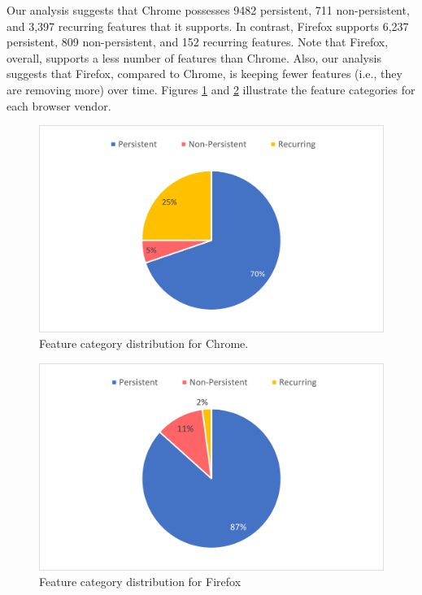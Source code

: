 Our analysis suggests that Chrome possesses 9482 persistent, 711
non-persistent, and 3,397 recurring features that it supports. In
contrast, Firefox supports 6,237 persistent, 809 non-persistent, and
152 recurring features. Note that Firefox, overall, supports a less
number of features than Chrome. Also, our analysis suggests that Firefox,
compared to Chrome, is keeping fewer features (i.e., they are removing
more) over time. Figures \ref{fig:chrome-categories} and
\ref{fig:firefox-categories} illustrate the feature categories for
each browser vendor.

\begin{figure}[ht]
    \centering
    \includegraphics[width=\columnwidth]{figures/chrome-feature-categories.png}
    \caption{Feature category distribution for Chrome.}
    \label{fig:chrome-categories}
\end{figure}

\begin{figure}[ht]
    \centering
    \includegraphics[width=\columnwidth]{figures/firefox-feature-categories.png}
    \caption{Feature category distribution for Firefox}
    \label{fig:firefox-categories}
  \end{figure}

